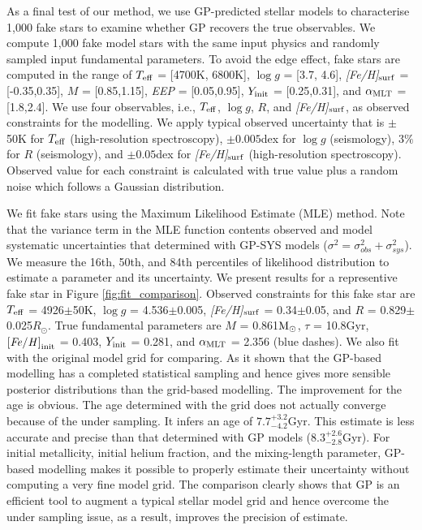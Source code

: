 As a final test of our method, we use GP-predicted stellar models to characterise 1,000 fake stars to examine whether GP recovers the true observables. 
We compute 1,000 fake model stars with the same input physics and randomly sampled input fundamental parameters. To avoid the edge effect, fake stars are computed in the range of $T_{\rm eff}$ = [4700K, 6800K], $\log g$ = [3.7, 4.6], {\it [Fe/H]}$_{\rm surf}$ = [-0.35,0.35], $M$ = [0.85,1.15], {\it EEP} = [0.05,0.95], $Y_{\rm init}$ = [0.25,0.31], and $\alpha_{\rm MLT}$ = [1.8,2.4].
%
We use four observables, i.e., $T_{\rm eff}$, $\log g$, $R$, and {\it [Fe/H]}$_{\rm surf}$, as observed constraints for the modelling. We apply typical observed uncertainty that is $\pm$50K for $T_{\rm eff}$ (high-resolution spectroscopy), $\pm0.005$dex for $\log g$ (seismology), $3\%$ for $R$ (seismology), and $\pm0.05$dex for {\it [Fe/H]}$_{\rm surf}$ (high-resolution spectroscopy). Observed value for each constraint is calculated with true value plus a random noise which follows a Gaussian distribution.  

We fit fake stars using the Maximum Likelihood Estimate (MLE) method. Note that the variance term in the MLE function contents observed and model systematic uncertainties that determined with GP-SYS models ($\sigma^{2} = \sigma_{obs}^{2} +  \sigma_{sys}^{2} $). We measure the 16th, 50th, and 84th percentiles of likelihood distribution to estimate a parameter and its uncertainty. 
%
We present results for a representive fake star in Figure \ref{fig:fit_comparison}. Observed constraints for this fake star are $T_{\rm eff}$ = 4926$\pm$50K, $\log g$ = 4.536$\pm$0.005, {\it [Fe/H]}$_{\rm surf}$ =  0.34$\pm$0.05, and $R$ =  0.829$\pm$0.025$R_{\odot}$. True fundamental parameters are $M$ = 0.861$\rm M_{\odot}$, $\tau$ = 10.8Gyr, $\rm {\it [Fe/H]}_{init}$ = 0.403, $Y_{\rm init}$ = 0.281, and $\alpha_{\rm MLT}$ = 2.356 (blue dashes). We also  fit with the original model grid for comparing.
%
As it shown that the GP-based modelling has a completed statistical sampling and hence gives more sensible posterior distributions than the grid-based modelling. The improvement for the age is obvious. The age determined with the grid does not actually converge because of the under sampling. It infers an age of $7.7^{+3.2}_{-4.2}$Gyr. This estimate is less accurate and precise than that determined with GP models ($8.3^{+2.6}_{-2.8}$Gyr). 
%
For initial metallicity, initial helium fraction, and the mixing-length parameter, GP-based modelling makes it possible to properly estimate their uncertainty without computing a very fine model grid. The comparison clearly shows that GP is an efficient tool to augment a typical stellar model grid and hence overcome the under sampling issue, as a result, improves the precision of estimate.  

